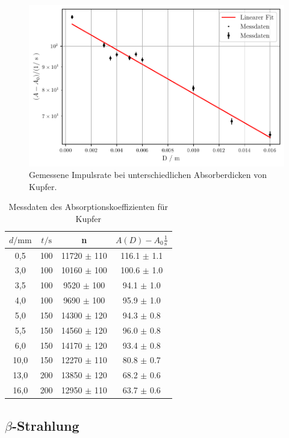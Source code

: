 \begin{figure}
    \centering
    \includegraphics[width=0.7 \linewidth]{build/plot2.pdf}
    \caption{Gemessene Impulsrate bei unterschiedlichen Absorberdicken von Kupfer.}
    \label{fig:plot2}
\end{figure}

\begin{table}[H]
    \centering
    \caption{Messdaten des Absorptionskoeffizienten für Kupfer}
    \label{tab:md2kupfer}
    \begin{tabular}{c c c c}
        \toprule
        $d / \unit{\milli\meter}$ &  $t / \unit\second$ &     n & $A(D) - A_0 \frac{1}{\unit\second}$\\
        \midrule
            0,5 &    100 & 11720 $\pm$ 110 & 116.1 $\pm$ 1.1 \\
            3,0 &    100 & 10160 $\pm$ 100 & 100.6 $\pm$ 1.0 \\
            3,5 &    100 &  9520 $\pm$ 100 &  94.1 $\pm$ 1.0 \\
            4,0 &    100 &  9690 $\pm$ 100 &  95.9 $\pm$ 1.0 \\
            5,0 &    150 & 14300 $\pm$ 120 &  94.3 $\pm$ 0.8 \\
            5,5 &    150 & 14560 $\pm$ 120 &  96.0 $\pm$ 0.8 \\
            6,0 &    150 & 14170 $\pm$ 120 &  93.4 $\pm$ 0.8 \\
           10,0 &    150 & 12270 $\pm$ 110 &  80.8 $\pm$ 0.7 \\
           13,0 &    200 & 13850 $\pm$ 120 &  68.2 $\pm$ 0.6 \\
           16,0 &    200 & 12950 $\pm$ 110 &  63.7 $\pm$ 0.6 \\
        \bottomrule
    \end{tabular}
\end{table}


\subsection[Beta-Strahlung]{$\beta$-Strahlung}

